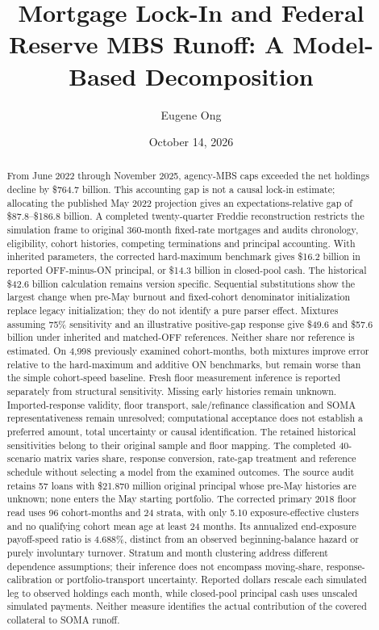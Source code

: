 \documentclass[12pt]{article}
\title{Mortgage Lock-In and Federal Reserve MBS Runoff: A Model-Based Decomposition}
\author{Eugene Ong}
\affil{Carnegie Mellon University}
\date{October 14, 2026}
\begin{document}
\maketitle
\begin{abstract}
\noindent From June 2022 through November 2025, agency-MBS caps exceeded the net holdings decline by \$764.7 billion. This accounting gap is not a causal lock-in estimate; allocating the published May 2022 projection gives an expectations-relative gap of \$87.8--\$186.8 billion. A completed twenty-quarter Freddie reconstruction restricts the simulation frame to original 360-month fixed-rate mortgages and audits chronology, eligibility, cohort histories, competing terminations and principal accounting. With inherited parameters, the corrected hard-maximum benchmark gives \$16.2 billion in reported OFF-minus-ON principal, or \$14.3 billion in closed-pool cash. The historical \$42.6 billion calculation remains version specific. Sequential substitutions show the largest change when pre-May burnout and fixed-cohort denominator initialization replace legacy initialization; they do not identify a pure parser effect. Mixtures assuming 75\% sensitivity and an illustrative positive-gap response give \$49.6 and \$57.6 billion under inherited and matched-OFF references. Neither share nor reference is estimated. On 4,998 previously examined cohort-months, both mixtures improve error relative to the hard-maximum and additive ON benchmarks, but remain worse than the simple cohort-speed baseline. Fresh floor measurement inference is reported separately from structural sensitivity. Missing early histories remain unknown. Imported-response validity, floor transport, sale/refinance classification and SOMA representativeness remain unresolved; computational acceptance does not establish a preferred amount, total uncertainty or causal identification. The retained historical sensitivities belong to their original sample and floor mapping. The completed 40-scenario matrix varies share, response conversion, rate-gap treatment and reference schedule without selecting a model from the examined outcomes. The source audit retains 57 loans with \$21.870 million original principal whose pre-May histories are unknown; none enters the May starting portfolio. The corrected primary 2018 floor read uses 96 cohort-months and 24 strata, with only 5.10 exposure-effective clusters and no qualifying cohort mean age at least 24 months. Its annualized end-exposure payoff-speed ratio is 4.688\%, distinct from an observed beginning-balance hazard or purely involuntary turnover. Stratum and month clustering address different dependence assumptions; their inference does not encompass moving-share, response-calibration or portfolio-transport uncertainty. Reported dollars rescale each simulated leg to observed holdings each month, while closed-pool principal cash uses unscaled simulated payments. Neither measure identifies the actual contribution of the covered collateral to SOMA runoff.
\end{abstract}
\end{document}
